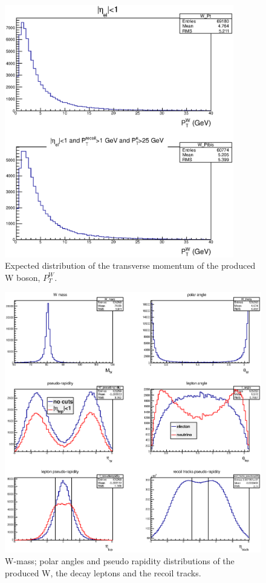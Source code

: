 \documentclass[12pt]{article}
\begin{document}
\begin{figure}[tbhp]
\begin{center}
\includegraphics[width=10cm]{images/W_Pt.eps}
\end{center}
\caption{\label{fig:MC_W_Pt} Expected distribution of the transverse momentum of the produced W boson, $P^W_T$.}
\end{figure}

\begin{figure}[tbhp]
\begin{center}
\includegraphics[width=14cm]{images/W_rapidity.eps}
\end{center}
\caption{\label{fig:MC_W_eta} W-mass; polar angles and pseudo rapidity distributions of the produced W, the decay leptons and the recoil tracks.}
\end{figure}
\end{document}

